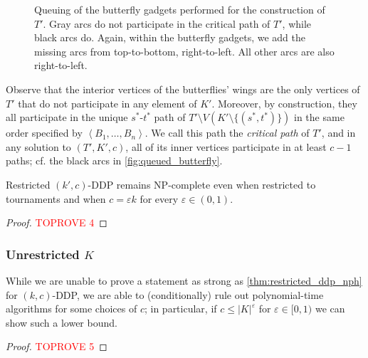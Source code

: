 \documentclass[a4paper,UKenglish,cleveref, autoref, thm-restate]{lipics-v2021}
\renewcommand{\NP}{{\sf NP}\xspace}
\newcommand{\angled}[1]{\left\langle{#1}\right\rangle}
\newcommand{\pname}[1]{{\sc #1}}
\newcommand{\congestion}{c}
\begin{document}
\begin{figure}[!htb]
    \caption{Queuing of the butterfly gadgets performed for the construction of $T'$. Gray
      arcs do not participate in the critical path of $T'$, while black arcs do. Again,
      within the butterfly gadgets, we add the missing arcs from top-to-bottom,
      right-to-left. All other arcs are also right-to-left.
    \label{fig:queued_butterfly}}
  \end{figure}

  Observe that the interior vertices of the butterflies' wings are the only vertices of
  $T'$ that do not participate in any element of $K'$.
  Moreover, by construction, they all participate in the unique $s^*$-$t^*$ path of $T'
  \setminus V(K' \setminus \{(s^*, t^*)\})$ in the same order specified by $\angled{B_1,
  \dots, B_n}$.
  We call this path the \textit{critical path} of $T'$, and in any solution to $(T', K',
  \congestion)$, all of its inner vertices participate in at least $\congestion-1$ paths;
  cf. the black arcs in \autoref{fig:queued_butterfly}.

  \begin{theorem}
    \label{thm:restricted_ddp_nph}
    \pname{Restricted $(k',c)$-DDP} remains \NP-complete even when
    restricted to tournaments and when $\congestion = \varepsilon k$ for every $\varepsilon \in (0,1)$. \end{theorem}

  \begin{proof}\textcolor{red}{TOPROVE 4}\end{proof}

  \subsubsection{Unrestricted $K$}

  While we are unable to prove a statement as strong as
  \autoref{thm:restricted_ddp_nph} for \pname{$(k,c)$-DDP}, we
  are able to (conditionally) rule out polynomial-time algorithms for some choices of $\congestion$;
  in particular, if $\congestion \leq |K|^\varepsilon$ for $\varepsilon \in [0,1)$ we can show
  such a lower bound.

  \epsilonddp*

  \begin{proof}\textcolor{red}{TOPROVE 5}\end{proof}
\end{document}
